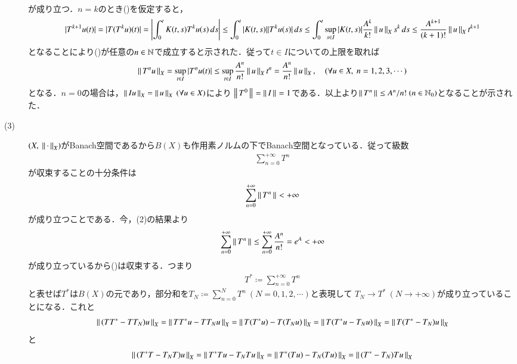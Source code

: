 \begin{prf}
\begin{description}
\begin{align}
		\end{align}
		が成り立つ．$n=k$のとき()を仮定すると，
		\begin{align}
			|T^{k+1}u(t)| = |T(T^ku)(t)| = \left|\int_{0}^{t} K(t,s)T^ku(s)\, ds\right|
			\leq \int_{0}^{t} |K(t,s)||T^ku(s)|\, ds
			\leq \int_{0}^{t} \operatorname*{sup}_{s \in I} |K(t,s)|\frac{A^k}{k!}\left\|\, u\, \right\|_{X}s^k\, ds
			\leq \frac{A^{k+1}}{(k+1)!}\left\|\, u\, \right\|_{X}t^{k+1}
		\end{align}
		となることにより()が任意の$n \in \mathbb{N}$で成立すると示された．従って$t \in I$についての上限を取れば
		\begin{align}
			\left\|\, T^nu\, \right\|_{X} = \operatorname*{sup}_{t \in I} |T^nu(t)| \leq \operatorname*{sup}_{t \in I} \frac{A^n}{n!}\left\|\, u\, \right\|_{X}t^n = \frac{A^n}{n!}\left\|\, u\, \right\|_{X}, 
			\quad (\forall u \in X,\ n = 1,2,3,\cdots)
		\end{align}
		となる．$n=0$の場合は，$\left\|\, Iu\, \right\|_{X} = \left\|\, u\, \right\|_{X}\ (\forall u \in X)$により
		$\left\|\, T^0\, \right\|_{} = \left\|\, I\, \right\|_{} = 1$である．以上より$\left\|\, T^n\, \right\|_{} \leq A^n/n!\ (n \in \mathbb{N}_0)$となることが示された．
	\item[(3)] $(X,\ \Norm{\cdot}{X})$がBanach空間であるから$B(X)$も作用素ノルムの下でBanach空間となっている．従って級数
		\begin{align}
			\sum_{n=0}^{+\infty} T^n \label{eq:func_analy_series}
		\end{align}
		が収束することの十分条件は
		\begin{align}
			\sum_{n=0}^{+\infty} \left\|\, T^n\, \right\|_{} < +\infty
		\end{align}
		が成り立つことである．今，(2)の結果より
		\begin{align}
			\sum_{n=0}^{+\infty} \left\|\, T^n\, \right\|_{} \leq \sum_{n=0}^{+\infty} \frac{A^n}{n!} = e^{A} < +\infty
		\end{align}
		が成り立っているから()は収束する．つまり
		\begin{align}
			T^* \coloneqq \sum_{n=0}^{+\infty} T^n
		\end{align}
		と表せば$T^*$は$B(X)$の元であり，部分和を$T_N \coloneqq \sum_{n=0}^{N} T^n\ (N = 0,1,2,\cdots)$と表現して
		$T_N \rightarrow T^*\ (N \rightarrow +\infty)$が成り立っていることになる．これと
		\begin{align}
			\left\|\, (TT^* - TT_N)u\, \right\|_{X} = \left\|\, TT^*u - TT_Nu\, \right\|_{X} = \left\|\, T(T^*u) - T(T_Nu)\, \right\|_{X} = \left\|\, T(T^*u - T_Nu)\, \right\|_{X} = \left\|\, T(T^* - T_N)u\, \right\|_{X}
		\end{align}
		と
		\begin{align}
			\Norm{(T^*T - T_NT)u}{X} = \Norm{T^*Tu - T_NTu}{X} = \Norm{T^*(Tu) - T_N(Tu)}{X} = \Norm{(T^*-T_N)Tu}{X}

\end{align}
\end{description}
\end{prf}
